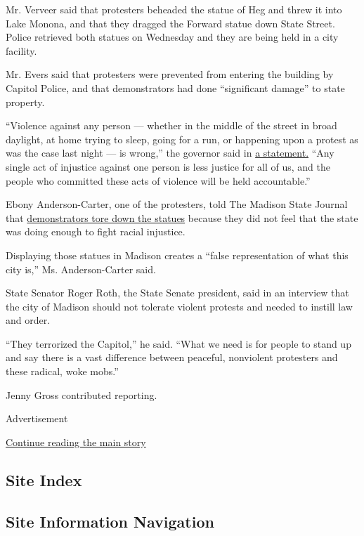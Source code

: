 Mr. Verveer said that protesters beheaded the statue of Heg and threw it
into Lake Monona, and that they dragged the Forward statue down State
Street. Police retrieved both statues on Wednesday and they are being
held in a city facility.

Mr. Evers said that protesters were prevented from entering the building
by Capitol Police, and that demonstrators had done ``significant
damage'' to state property.

``Violence against any person --- whether in the middle of the street in
broad daylight, at home trying to sleep, going for a run, or happening
upon a protest as was the case last night --- is wrong,'' the governor
said in
\href{https://content.govdelivery.com/accounts/WIGOV/bulletins/2925906}{a
statement.} ``Any single act of injustice against one person is less
justice for all of us, and the people who committed these acts of
violence will be held accountable.''

Ebony Anderson-Carter, one of the protesters, told The Madison State
Journal that
\href{https://madison.com/wsj/news/local/crime-and-courts/protesters-tear-down-statues-punch-senator-set-small-fire-after-arrest-of-black-activist/article_8356b4c1-4dbf-52ff-9d5b-cadb98bf5356.html\#tracking-source=home-top-story-1}{demonstrators
tore down the statues} because they did not feel that the state was
doing enough to fight racial injustice.

Displaying those statues in Madison creates a ``false representation of
what this city is,'' Ms. Anderson-Carter said.

State Senator Roger Roth, the State Senate president, said in an
interview that the city of Madison should not tolerate violent protests
and needed to instill law and order.

``They terrorized the Capitol,'' he said. ``What we need is for people
to stand up and say there is a vast difference between peaceful,
nonviolent protesters and these radical, woke mobs.''

Jenny Gross contributed reporting.

Advertisement

\protect\hyperlink{after-bottom}{Continue reading the main story}

\hypertarget{site-index}{%
\subsection{Site Index}\label{site-index}}

\hypertarget{site-information-navigation}{%
\subsection{Site Information
Navigation}\label{site-information-navigation}}

